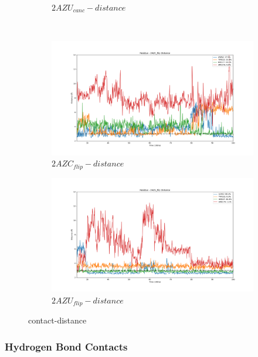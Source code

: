 \documentclass[fleqn,10pt]{wlscirep}
\begin{document}
\begin{figure}[!ht]
\begin{subfigure}{.45\textwidth}
     \caption{$2AZU_{canc}-distance$}
     \label{fig:2AZU_canc-dist}
   \end{subfigure}
   \\
   \begin{subfigure}{.45\textwidth}
     \centering
     \includegraphics[width=.95\linewidth]{2AZC_flip/2AZC_flip-dist_3.png}
     \caption{$2AZC_{flip}-distance$}
     \label{fig:2AZC_flip-dist}
   \end{subfigure}
    \begin{subfigure}{.45\textwidth}
     \centering
     \includegraphics[width=.95\linewidth]{2AZU_flip/2AZU_flip-dist_4.png}
     \caption{$2AZU_{flip}-distance$}
     \label{fig:2AZU_flip-dist}
   \end{subfigure}
\caption{contact-distance}
\label{fig:contact-distance}
\end{figure}  

\subsubsection{Hydrogen Bond Contacts}
\end{document}
